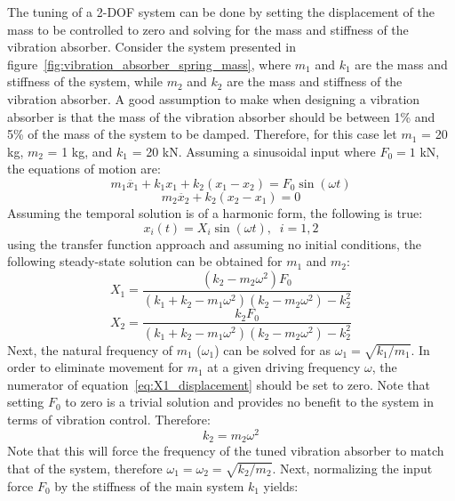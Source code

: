 \documentclass[12pt,letter]{article}
\begin{document}
The tuning of a 2-DOF system can be done by setting the displacement of the mass to be controlled to zero and solving for the mass and stiffness of the vibration absorber. Consider the system presented in figure~\ref{fig:vibration_absorber_spring_mass}, where $m_1$ and $k_1$ are the mass and stiffness of the system, while $m_2$ and $k_2$ are the mass and stiffness of the vibration absorber. A good assumption to make when designing a vibration absorber is that the mass of the vibration absorber should be between 1\% and 5\% of the mass of the system to be damped. Therefore, for this case let $m_1$ = 20 kg, $m_2$ = 1 kg, and $k_1$ = 20 kN. Assuming a sinusoidal input where $F_0 = 1$ kN, the equations of motion are:
\begin{equation}
m_1\ddot{x_1} + k_1 x_1 + k_2(x_1-x_2)  = F_0 \sin (\omega t)
\end{equation}
\begin{equation}
m_2\ddot{x_2} + k_2(x_2-x_1) = 0
\end{equation}
Assuming the temporal solution is of a harmonic form, the following is true:
\begin{equation}
x_i(t) = X_i \sin (\omega t ), \; \; i=1,2
\end{equation}
using the transfer function approach and assuming no initial conditions, the following steady-state solution can be obtained for $m_1$ and $m_2$:
\begin{equation}
X_1 = \frac{(k_2 - m_2 \omega^2)F_0}{(k_1+k_2-m_1 \omega^2)(k_2-m_2 \omega^2) -k_2^2}
\label{eq:X1_displacement}
\end{equation}
\begin{equation}
X_2 = \frac{k_2 F_0}{(k_1+k_2-m_1 \omega^2)(k_2-m_2 \omega^2) -k_2^2}
\label{eq:X2_displacement}
\end{equation}
Next, the natural frequency of $m_1$ ($\omega_1$) can be solved for as $\omega_1=\sqrt{k_1 / m_1}$. In order to eliminate movement for $m_1$ at a given driving frequency $\omega$, the numerator of equation~\ref{eq:X1_displacement} should be set to zero. Note that setting $F_0$ to zero is a trivial solution and provides no benefit to the system in terms of vibration control. Therefore:
\begin{equation}
k_2 = m_2 \omega^2
\end{equation}
Note that this will force the frequency of the tuned vibration absorber to match that of the system, therefore $\omega_1 = \omega_2 = \sqrt{k_2 / m_2}$. Next, normalizing the input force $F_0$ by the stiffness of the main system $k_1$ yields:
\end{document}
